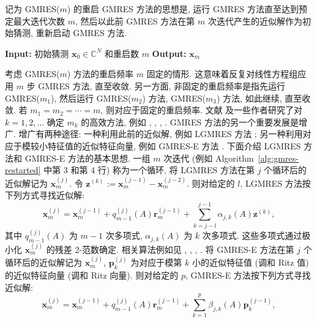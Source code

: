 {记为 GMRES($m$) 的重启 GMRES 方法的思想是, 运行 GMRES 方法直至达到预定最大迭代次数 $m$, 然后以此前 GMRES 方法在第 $m$ 次迭代产生的近似解作为初始猜测, 重新启动 GMRES 方法.}
\begin{algorithm}[H]\caption{{GMRES($m$) 方法}}\label{alg:gmres-restarted}\begin{algorithmic}[1]
\Statex\textbf{Input:} {初始猜测 $\bm x_0\in\mathbb C^N$ 和重启数 $m$}
\Statex\textbf{Output:} $\bm x_m$
\EndWhile\end{algorithmic}\end{algorithm}
{考虑 GMRES($m$) 方法的重启频率 $m$ 固定的情形. 这意味着反复对线性方程组应用 $m$ 步 GMRES 方法, 直至收敛. 另一方面, 非固定的重启频率是指先运行 GMRES($m_1$), 然后运行 GMRES($m_2$) 方法, GMRES($m_3$) 方法, 如此继续, 直至收敛. 若 $m_1=m_2=\cdots=m$, 则对应于固定的重启频率.}
{文献  及一些作者研究了对 $k=1,2,\ldots$ 确定 $m_k$ 的高效方法, 例如 , , , .}
{GMRES 方法的另一个重要发展是增广. 增广有两种途径: 一种利用此前的近似解, 例如 LGMRES 方法 ; 另一种利用对应于模较小特征值的近似特征向量, 例如 GMRES-E 方法 . 下面介绍 LGMRES 方法和 GMRES-E 方法的基本思想.}
{一组 $m$ 次迭代 (例如 Algorithm\ \ref{alg:gmres-restarted} 中第 3 和第 4 行) 称为一个循环, 将 LGMRES 方法在第 $j$ 个循环后的近似解记为 $\bm x_m^{(j)}$. 令 $\bm z^{(k)}:=\bm x_m^{(j-1)}-\bm x_m^{(j-2)}$. 则对给定的 $l$, LGMRES 方法按下列方式寻找近似解:}
\[\bm x_m^{(j)}=\bm x_m^{(j-1)}+q_{m-1}^{(j)}(A)\bm r_m^{(j-1)}+\sum_{k=j-l}^{j-1}\alpha_{j,k}(A)\bm z^{(k)},\]
{其中 $q_{m-1}^{(j)}(A)$ 为 $m-1$ 次多项式, $\alpha_{j,k}(A)$ 为 $k$ 次多项式. 这些多项式通过极小化 $\bm x_m^{(j)}$ 的残差 2-范数确定. 相关算法例如见 , , , .}
{将 GMRES-E 方法在第 $j$ 个循环后的近似解记为 $\bm x_m^{(j)}$, $\bm p_k^{(j)}$ 为对应于模第 $k$ 小的近似特征值 (调和 Ritz 值) 的近似特征向量 (调和 Ritz 向量). 则对给定的 $p$, GMRES-E 方法按下列方式寻找近似解:}
\[\bm x_m^{(j)}=\bm x_m^{(j-1)}+q_{m-1}^{(j)}(A)\bm r_m^{(j-1)}+\sum_{k=1}^{p}\beta_{j,k}(A)\bm p_k^{(j-1)},\]
